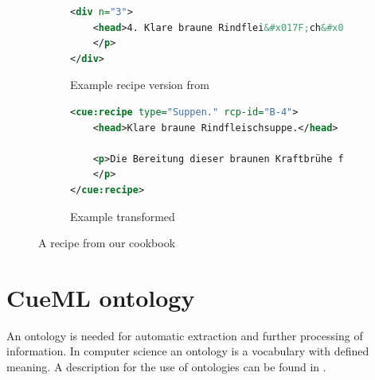 \documentclass[12pt, twoside]{report}
\begin{document}
\begin{figure}
	\begin{subfigure}{1\textwidth}
	\begin{lstlisting}[language=XML]
<div n="3">
	<head>4. Klare braune Rindflei&#x017F;ch&#x017F;uppe.</head> <lb/> <p>Die Bereitung die&#x017F;er braunen Kraftbrühe findet man in<lb/> <hi rendition="#aq">A.</hi> No. 12. Zu einer Ge&#x017F;ell&#x017F;chaft	von 12 Per&#x017F;onen nimmt<lb/> man 6 Pfund Rindflei&#x017F;ch und 1 Pfund rohen Schinken. Es<lb/> werden braune Klöße No. 3 und Schwammklöße darin gemacht.<lb/> Auch kann man nach Belieben braunen Sago darin kochen.
	</p>
</div>
	\end{lstlisting}\caption{Example recipe version from \parencite{DTA}}\vspace{1em}
	\end{subfigure}
	\begin{subfigure}{1\textwidth}
\begin{lstlisting}[language=XML]
<cue:recipe type="Suppen." rcp-id="B-4">
	<head>Klare braune Rindfleischsuppe.</head>
	
	<p>Die Bereitung dieser braunen Kraftbrühe findet man in A. No. 12. Zu einer Gesellschaft von 12 Personen nimmt man 6 Pfund Rindfleisch und 1 Pfund rohen Schinken. Es werden braune Klöße No. 3 und Schwammklöße darin gemacht. Auch kann man nach Belieben braunen Sago darin kochen.
	</p>
</cue:recipe>
\end{lstlisting}\caption{Example transformed}
	\end{subfigure}
	\caption{A recipe from our cookbook}
	\label{fig:davidisRecipe}
\end{figure}


\section{CueML ontology}\label{sec:cueMLOntology}
An ontology is needed for automatic extraction and further processing of information. In computer science an ontology is a vocabulary with defined meaning. A description for the use of ontologies can be found in \parencite{semanticWeb}.
\end{document}
